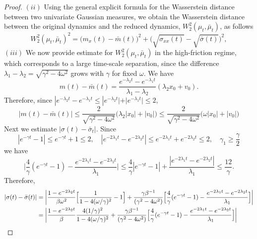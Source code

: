 \documentclass[a4paper,twoside]{article}      %
\theoremstyle{definition}
\begin{document}
\begin{proof}
$(ii)$ Using the general explicit formula for the Wasserstein distance between two univariate Gaussian measures, we obtain the Wasserstein distance between the original dynamics and the reduced dynamics, $W^2_2(\mu_t,\bar{\mu}_t)$, as follows
\begin{equation}
W_2^2(\mu_t,\bar{\mu}_t)^2=\Big(m_x(t)-\bar{m}(t)\Big)^2+\Big(\sqrt{\sigma_{xx}(t)}-\sqrt{\bar{\sigma}(t)}\Big)^2,
\end{equation}
$(iii)$ We now provide estimate for $W_2^2(\mu_t,\bar{\mu}_t)$ in the high-friction regime, which corresponds to a large time-scale separation, since the difference $\lambda_1-\lambda_2=\sqrt{\gamma^2-4\omega^2}$ grows with $\gamma$ for fixed $\omega$. We have
\begin{equation}
\label{eq: difference mean}
m(t)-\bar{m}(t)=\frac{e^{-\lambda_2 t}-e^{-\lambda_1 t}}{\lambda_1-\lambda_2}(\lambda_2 x_0+ v_0).
\end{equation}
Therefore, since $|e^{-\lambda_2 t}-e^{-\lambda_1 t}\leq |e^{-\lambda_2 t}|+|e^{-\lambda_1 t}|\leq 2$,
$$
|m(t)-\bar{m}(t)|\leq \frac{2}{\sqrt{\gamma^2-4\omega^2}}\big(\lambda_2 |x_0|+|v_0|\big)\leq \frac{2}{\sqrt{\gamma^2-4\omega^2}}\big(\omega |x_0|+|v_0|\big)
$$
Next we estimate $|\sigma(t)-\bar{\sigma}_t|$. Since
$$
|e^{-\gamma t}-1|\leq e^{-\gamma t} +1\leq 2, \quad |e^{-2\lambda_1 t}-e^{-2\lambda_2 t}|\leq e^{-2\lambda_1 t}+e^{-2\lambda_2 t}\leq 2, \quad \gamma_1\geq \frac{\gamma}{2}
$$
we have
$$
\Big|\frac{4}{\gamma}(e^{-\gamma t}-1)-\frac{e^{-2\lambda_1 t}-e^{-2\lambda_2 t}}{\lambda_1}\Big|\leq \frac{4}{\gamma}|e^{-\gamma t}-1|+\frac{|e^{-2\lambda_1 t}-e^{-2\lambda_2 t}|}{\lambda_1}\leq \frac{12}{\gamma}.
$$
Therefore,
\begin{align}
|\sigma(t)-\bar{\sigma}(t)|&=\left|\frac{1-e^{-2\lambda_2 t}}{\beta\omega^2}\Big[\frac{1}{1-4(\omega/\gamma)^2}-1\Big]+\frac{\gamma\beta^{-1}}{(\gamma^2-4\omega^2)}\Big[\frac{4}{\gamma}(e^{-\gamma t}-1)-\frac{e^{-2\lambda_1 t}-e^{-2\lambda_2 t}}{\lambda_1}\Big]\right|\label{eq: difference variance}
\\&=\left|\frac{1-e^{-2\lambda_2 t}}{\beta}\frac{4(1/\gamma)^2}{1-4(\omega/\gamma)^2}+\frac{\gamma\beta^{-1}}{(\gamma^2-4\omega^2)}\Big[\frac{4}{\gamma}(e^{-\gamma t}-1)-\frac{e^{-2\lambda_1 t}-e^{-2\lambda_2 t}}{\lambda_1}\Big]\right|\notag

\end{align}
\end{proof}
\end{document}
